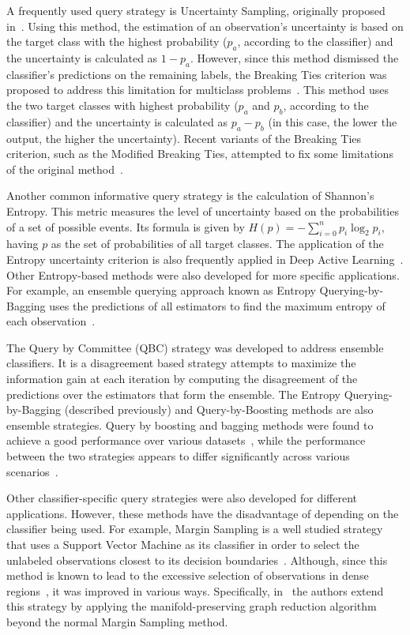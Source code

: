 \documentclass[parskip=full]{scrartcl}
\begin{document}
A frequently used query strategy is Uncertainty Sampling, originally proposed
in~\cite{Lewis1994}. Using this method, the estimation of an observation's
uncertainty is based on the target class with the highest probability ($p_a$,
according to the classifier) and the uncertainty is calculated as $1-p_a$.
However, since this method dismissed the classifier's predictions on the
remaining labels, the Breaking Ties criterion was proposed to address this
limitation for multiclass problems~\cite{Luo2005}. This method uses the two
target classes with highest probability ($p_a$ and $p_b$, according to the
classifier) and the uncertainty is calculated as $p_a - p_b$ (in this case,
the lower the output, the higher the uncertainty). Recent variants of the
Breaking Ties criterion, such as the Modified Breaking Ties, attempted to fix
some limitations of the original method~\cite{Liu2018, Li2012a}.

Another common informative query strategy is the calculation of Shannon's
Entropy. This metric measures the level of uncertainty
based on the probabilities of a set of possible events. Its formula is given
by $H(p)=-\sum_{i=0}^n{p_i\log_2{p_i}}$, having $p$ as the set of
probabilities of all target classes. The application of the Entropy
uncertainty criterion is also frequently applied in Deep Active
Learning~\cite{Aghdam2019}. Other Entropy-based methods were also developed
for more specific applications. For example, an ensemble querying approach
known as Entropy Querying-by-Bagging uses the predictions of all estimators to
find the maximum entropy of each observation~\cite{Abe1998}.

The Query by Committee (QBC) strategy was developed to address ensemble
classifiers. It is a disagreement based strategy attempts to maximize the
information gain at each iteration by computing the disagreement of the
predictions over the estimators that form the ensemble. The Entropy
Querying-by-Bagging (described previously) and Query-by-Boosting methods are
also ensemble strategies. Query by boosting and bagging methods were found to
achieve a good performance over various datasets~\cite{Melville2004}, while
the performance between the two strategies appears to differ significantly
across various scenarios~\cite{Bloodgood2018}.

Other classifier-specific query strategies were also developed for different
applications. However, these methods have the disadvantage of depending on the
classifier being used. For example, Margin Sampling is a well studied
strategy that uses a Support Vector Machine as its classifier
in order to select the unlabeled observations closest to its decision
boundaries~\cite{Kumar2020}. Although, since this method is known to lead
to the excessive selection of observations in dense regions~\cite{Zhou2014},
it was improved in various ways. Specifically, in~\cite{Zhou2014} the authors
extend this strategy by applying the manifold-preserving graph reduction
algorithm beyond the normal Margin Sampling method.
\end{document}
